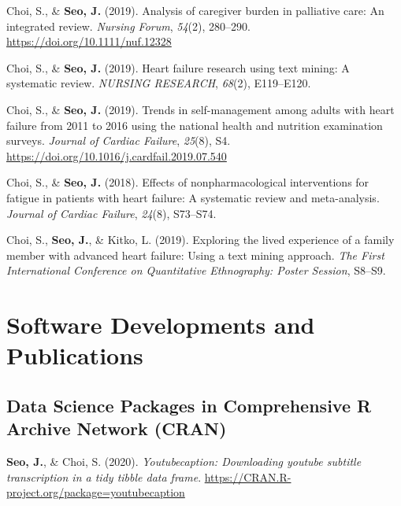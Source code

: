 \documentclass[11pt, a4paper]{awesome-cv}
\begin{document}
\leavevmode\hypertarget{ref-doi:10.1111ux2fnuf.12328}{}%
Choi, S., \& \textbf{Seo, J.} (2019). Analysis of caregiver burden in
palliative care: An integrated review. \emph{Nursing Forum},
\emph{54}(2), 280--290. \url{https://doi.org/10.1111/nuf.12328}

\leavevmode\hypertarget{ref-choi2019heart}{}%
Choi, S., \& \textbf{Seo, J.} (2019). Heart failure research using text
mining: A systematic review. \emph{NURSING RESEARCH}, \emph{68}(2),
E119--E120.

\leavevmode\hypertarget{ref-choi2019trends}{}%
Choi, S., \& \textbf{Seo, J.} (2019). Trends in self-management among
adults with heart failure from 2011 to 2016 using the national health
and nutrition examination surveys. \emph{Journal of Cardiac Failure},
\emph{25}(8), S4. \url{https://doi.org/10.1016/j.cardfail.2019.07.540}

\leavevmode\hypertarget{ref-choi2018effects}{}%
Choi, S., \& \textbf{Seo, J.} (2018). Effects of nonpharmacological
interventions for fatigue in patients with heart failure: A systematic
review and meta-analysis. \emph{Journal of Cardiac Failure},
\emph{24}(8), S73--S74.

\leavevmode\hypertarget{ref-choi2019exploring}{}%
Choi, S., \textbf{Seo, J.}, \& Kitko, L. (2019). Exploring the lived
experience of a family member with advanced heart failure: Using a text
mining approach. \emph{The First International Conference on
Quantitative Ethnography: Poster Session}, S8--S9.

\endgroup

\hypertarget{software-developments-and-publications}{%
\section{Software Developments and
Publications}\label{software-developments-and-publications}}

\hypertarget{data-science-packages-in-comprehensive-r-archive-network-cran}{%
\subsection{Data Science Packages in Comprehensive R Archive Network
(CRAN)}\label{data-science-packages-in-comprehensive-r-archive-network-cran}}

\begingroup
\setlength{\parindent}{-0.5in}
\setlength{\leftskip}{0.5in}

\hypertarget{refs_R_packages}{}
\leavevmode\hypertarget{ref-R-youtubecaption}{}%
\textbf{Seo, J.}, \& Choi, S. (2020). \emph{Youtubecaption: Downloading
youtube subtitle transcription in a tidy tibble data frame}.
\url{https://CRAN.R-project.org/package=youtubecaption}
\end{document}
